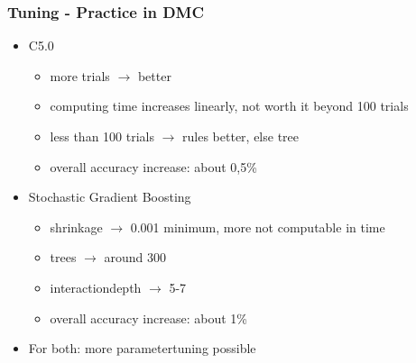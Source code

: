 \documentclass[color=usenames,dvipsnames]{beamer}
\begin{document}
\begin{frame}
\frametitle{Tuning - Practice in DMC}
	\begin{itemize}
	\item C5.0
	\begin{itemize}
		\item more trials $\rightarrow$ better
		\item computing time increases linearly, not worth it beyond 100 trials
		\item less than 100 trials $\rightarrow$ rules better, else tree
		\item overall accuracy increase: about 0,5\%
	\end{itemize}
	\item Stochastic Gradient Boosting
	\begin{itemize}
		\item shrinkage $\rightarrow$ 0.001 minimum, more not computable in time
		\item trees $\rightarrow$ around 300
		\item interactiondepth $\rightarrow$ 5-7
		\item overall accuracy increase: about 1\%
	\end{itemize}
	\item For both: more parametertuning possible
	\end{itemize}
\end{frame}
\end{document}
